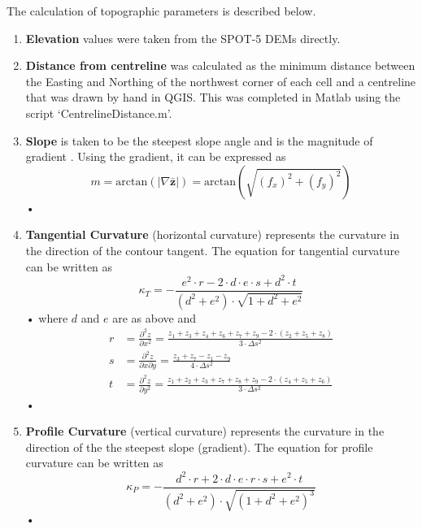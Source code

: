 \documentclass[12pt]{article}
\renewcommand{\vector}[1]{\mathbf{#1}}
\begin{document}
The calculation of topographic parameters is described below.
\begin{enumerate}
\item[]\textbf{Elevation} values were taken from the SPOT-5 DEMs directly.

\item[] \textbf{Distance from centreline} was calculated as the minimum distance between the Easting and Northing of the northwest corner of each cell and a centreline that was drawn by hand in QGIS. This was completed in Matlab using the script `CentrelineDistance.m'. 

\item[]  \textbf{Slope} is taken to be the steepest slope angle and is the magnitude of gradient \citep{Mitavsova1993}. Using the gradient, it can be expressed as  \citep{Olaya2009}
	\begin{equation}
	m = \textrm{arctan}(|\nabla \bar{ \vector{z}}|) = \textrm{arctan} \left( \sqrt{(f_x)^2 +( f_y)^2} \right)
	\end{equation}•
\item[] \textbf{Tangential Curvature} (horizontal curvature) represents the curvature in the direction of the contour tangent. The equation for tangential curvature can be written as \citep{Olaya2009}
	\begin{equation}
	\kappa_T = - \frac{e^2 \cdot r -2 \cdot d\cdot e \cdot s +d^2 \cdot t}{(d^2+e^2) \cdot \sqrt{1+d^2+e^2}}
	\end{equation}•
where $d$ and $e$ are as above and
	\begin{align}
	r &= \frac{\partial^2 z}{\partial x^2} = \frac{z_1+z_3+z_4+z_6+z_7+z_9-2 \cdot (z_2+z_5+z_8)}{3 \cdot \Delta s^2}\\
	s &= \frac{\partial^2 z}{\partial x \partial y} = \frac{z_3 + z_7- z_1 - z_9}{4 \cdot \Delta s^2}\\
	t &= \frac{\partial^2 z}{\partial y^2} = \frac{z_1+z_2+z_3+z_7+z_8+z_9-2 \cdot (z_4+z_5+z_6)}{3 \cdot \Delta s^2}
	\end{align}•	

\item[] \textbf{Profile Curvature} (vertical curvature) represents the curvature in the direction of the the steepest slope (gradient). The equation for profile curvature can be written as \citep{Olaya2009}
	\begin{equation}
	\kappa_P = - \frac{d^2 \cdot r +2 \cdot d\cdot e \cdot r \cdot s +e^2 \cdot t}{(d^2+e^2) \cdot \sqrt{(1+d^2+e^2)^3}}
	\end{equation}•


\end{enumerate}
\end{document}

